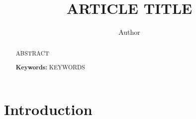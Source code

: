 \documentclass[a4paper,11pt]{amsart}
\begin{document}


\title[ARTICLE TITLE]{ARTICLE TITLE}

\author{Author}

\address{\noindent AFFILIATION}


\begin{abstract}
ABSTRACT 

\bigskip

\noindent \textbf{Keywords:} KEYWORDS  
\end{abstract}

\maketitle

\setcounter{tocdepth}{1}
\tableofcontents






\section{Introduction}









\end{document}
